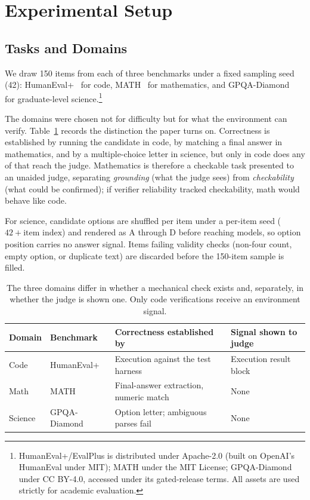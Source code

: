 \section{Experimental Setup}
\label{sec:setup}

\subsection{Tasks and Domains}
\label{sec:setup-tasks}

We draw 150 items from each of three benchmarks under a fixed sampling seed (42):
HumanEval+~\citep{liu2023evalplus} for code, MATH~\citep{hendrycks2021math} for
mathematics, and GPQA-Diamond~\citep{rein2024gpqa} for graduate-level
science.\footnote{HumanEval+/EvalPlus is distributed under Apache-2.0 (built on OpenAI's
HumanEval under MIT); MATH under the MIT License; GPQA-Diamond under CC BY-4.0, accessed
under its gated-release terms. All assets are used strictly for academic evaluation.}

The domains were chosen not for difficulty but for what the environment can verify.
Table~\ref{tab:domains} records the distinction the paper turns on. Correctness is
established by running the candidate in code, by matching a final answer in mathematics,
and by a multiple-choice letter in science, but only in code does any of that reach the
judge. Mathematics is therefore a checkable task presented to an unaided judge, separating \emph{grounding} (what the judge sees) from \emph{checkability} (what could be confirmed); if verifier reliability tracked checkability, math would behave like code.

For science, candidate options are shuffled per item under a per-item seed ($42 + \text{item index}$) and rendered as A through D before reaching models, so option position carries no answer signal. Items failing validity checks (non-four count, empty option, or duplicate text) are discarded before the 150-item sample is filled.

\begin{table}[H]
\caption{The three domains differ in whether a mechanical check exists and, separately, in
whether the judge is shown one. Only code verifications receive an environment signal.}
\label{tab:domains}
\begin{center}
\footnotesize
\renewcommand{\arraystretch}{0.92}
\begin{tabular}{llll}
\toprule
\bf Domain & \bf Benchmark & \bf Correctness established by & \bf Signal shown to judge \\
\midrule
Code    & HumanEval+   & Execution against the test harness     & Execution result block \\
Math    & MATH         & Final-answer extraction, numeric match & None \\
Science & GPQA-Diamond & Option letter; ambiguous parses fail    & None \\
\bottomrule
\end{tabular}
\end{center}
\end{table}

